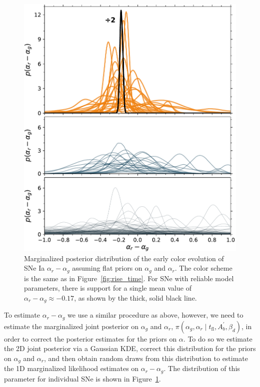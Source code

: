 \documentclass[twocolumn]{./aastex63}
\begin{document}
\begin{figure}
    \centering
    \includegraphics[width=1\linewidth]{./figures/delta.pdf}
    \caption{Marginalized posterior distribution of the early color evolution of
    SNe Ia $\alpha_r - \alpha_g$ assuming flat priors on $\alpha_g$ and
    $\alpha_r$. The color scheme is the same as in Figure~\ref{fig:rise_time}.
    For SNe with reliable model parameters, there is support for a single mean
    value of $\alpha_r - \alpha_g \approx -0.17$, as shown by the thick, solid
    black line.}
    \label{fig:delta}
\end{figure}

To estimate $\alpha_r - \alpha_g$ we use a similar procedure as above,
however, we need to estimate the marginalized joint posterior on $\alpha_g$
and $\alpha_r$, $\pi(\alpha_g,\alpha_r \mid t_\mathrm{fl}, A^\prime_b,
\beta_d)$, in order to correct the posterior estimates for the priors on
$\alpha$. To do so we estimate the 2D joint posterior via a Gaussian KDE,
correct this distribution for the priors on $\alpha_g$ and $\alpha_r$, and
then obtain random draws from this distribution to estimate the 1D
marginalized likelihood estimates on $\alpha_r - \alpha_g$. The distribution
of this parameter for individual SNe is shown in Figure~\ref{fig:delta}.
\end{document}
